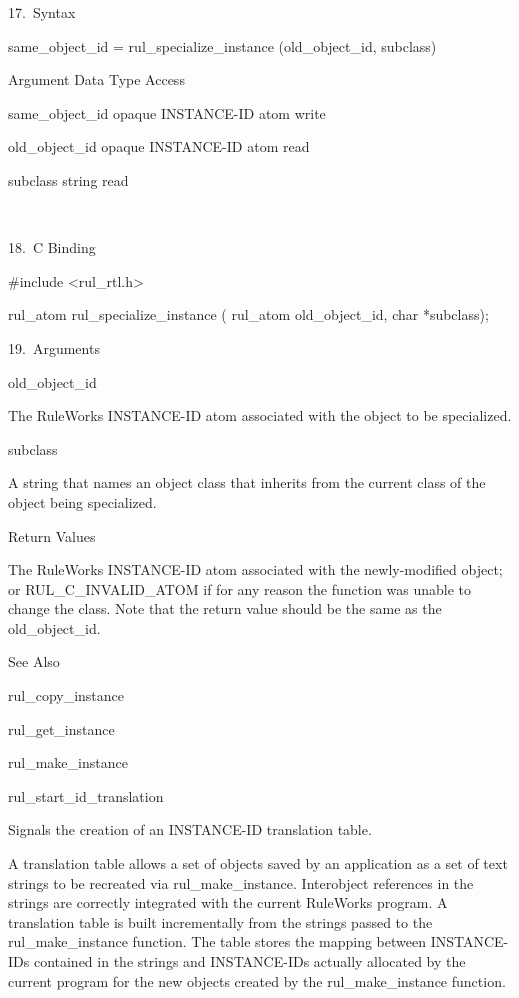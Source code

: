 {      17. Syntax

          same_object_id =
          rul_specialize_instance
          (old_object_id, subclass)

          Argument  Data Type     Access

          same_object_id  opaque INSTANCE-ID
          atom  write

          old_object_id  opaque INSTANCE-ID
          atom  read

          subclass  string     read

           

      18. C Binding

          #include <rul_rtl.h>

          rul_atom rul_specialize_instance (
          rul_atom old_object_id,
          char *subclass);

      19. Arguments

          old_object_id

          The RuleWorks INSTANCE-ID atom
          associated with the object to be
          specialized.

          subclass

          A string that names an object class
          that inherits from the current class
          of the object being specialized.

          Return Values

          The RuleWorks INSTANCE-ID atom
          associated with the newly-modified
          object; or RUL_C_INVALID_ATOM if for
          any reason the function was unable
          to change the class. Note that the
          return value should be the same as
          the old_object_id.

          See Also

          rul_copy_instance

          rul_get_instance

          rul_make_instance

          rul_start_id_translation

          Signals the creation of an
          INSTANCE-ID translation table.

          A translation table allows a set of
          objects saved by an application as a
          set of text strings to be recreated
          via rul_make_instance. Interobject
          references in the strings are
          correctly integrated with the
          current RuleWorks program. A
          translation table is built
          incrementally from the strings
          passed to the rul_make_instance
          function. The table stores the
          mapping between INSTANCE-IDs
          contained in the strings and
          INSTANCE-IDs actually allocated by
          the current program for the new
          objects created by the
          rul_make_instance function.

}
